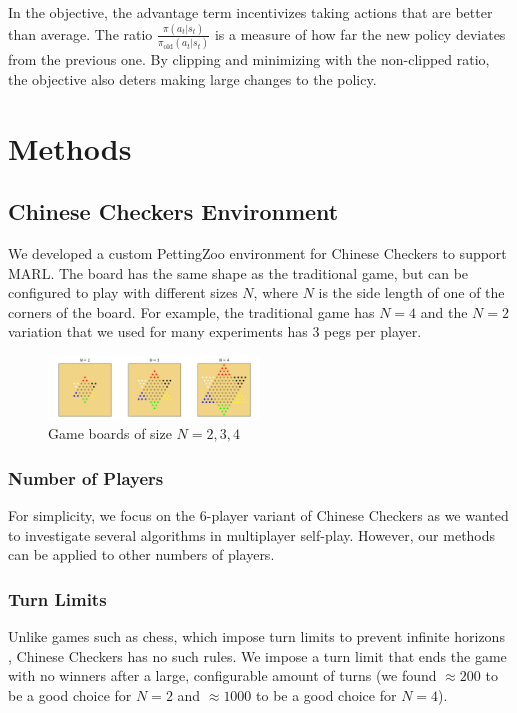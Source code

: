 \documentclass[12pt, a4paper, twocolumn]{article}
\begin{document}
In the objective, the advantage term incentivizes taking actions that are better than average. The ratio $\frac{\pi(a_t | s_t)}{\pi_{\text{old}}(a_t | s_t)}$ is a measure of how far the new policy deviates from the previous one. By clipping and minimizing with the non-clipped ratio, the objective also deters making large changes to the policy. 

\section{Methods}

\subsection{Chinese Checkers Environment}

We developed a custom PettingZoo environment for Chinese Checkers to support MARL. The board has the same shape as the traditional game, but can be configured to play with different sizes $N$, where $N$ is the side length of one of the corners of the board. For example, the traditional game has $N = 4$ and the $N = 2$ variation that we used for many experiments has 3 pegs per player.

\begin{figure}
  \centering
    \includegraphics[width=0.5\textwidth]{images/boards.png}
  \caption{Game boards of size $N = 2, 3, 4$}
  \label{fig:boards}
\end{figure}

\subsubsection{Number of Players}

For simplicity, we focus on the 6-player variant of Chinese Checkers as we wanted to investigate several algorithms in multiplayer self-play. However, our methods can be applied to other numbers of players.

\subsubsection{Turn Limits}

Unlike games such as chess, which impose turn limits to prevent infinite horizons \cite{ChessTurnLimit}, Chinese Checkers has no such rules. We impose a turn limit that ends the game with no winners after a large, configurable amount of turns (we found $\approx 200$ to be a good choice for $N=2$ and $\approx 1000$ to be a good choice for $N=4$).
\end{document}
